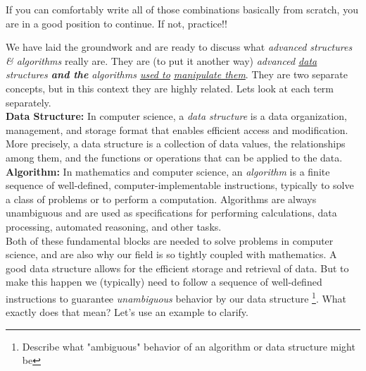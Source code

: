 If you can comfortably write all of those combinations basically from scratch, you are in a good position to continue. If not, practice!! 


We have laid the groundwork and are ready to discuss what \textit{advanced structures \& algorithms} really are. They are (to put it another way) \textit{advanced \underline{data} structures \textbf{and the} algorithms \underline{used to} \underline{manipulate them}}. They are two separate concepts, but in this context they are highly related. Lets look at each term separately.\\

\textbf{Data Structure:} In computer science, a \textit{data structure} is a data organization, management, and storage format that enables efficient access and modification. More precisely, a data structure is a collection of data values, the relationships among them, and the functions or operations that can be applied to the data.\\

\textbf{Algorithm:} In mathematics and computer science, an \textit{algorithm}  is a finite sequence of well-defined, computer-implementable instructions, typically to solve a class of problems or to perform a computation. Algorithms are always unambiguous and are used as specifications for performing calculations, data processing, automated reasoning, and other tasks.\\ 

Both of these fundamental blocks are needed to solve problems in computer science, and are also why our field is so tightly coupled with mathematics. A good data structure allows for the efficient storage and retrieval of data. But to make this happen we (typically) need to follow a sequence of well-defined instructions to guarantee \textit{unambiguous} behavior by our data structure \footnote{Describe what "ambiguous" behavior of an algorithm or data structure might be}. What exactly does that mean? Let's use an example to clarify.\\



